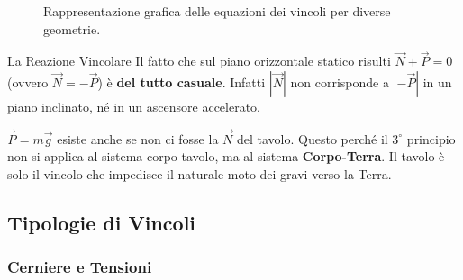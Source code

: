 \begin{figure}[h!]
    \caption{Rappresentazione grafica delle equazioni dei vincoli per diverse geometrie.}
    \label{fig:vincoli_rappresentazione}
\end{figure}

\begin{osservazione}{La Reazione Vincolare}
Il fatto che sul piano orizzontale statico risulti $\vec{N} + \vec{P} = 0$ (ovvero $\vec{N} = -\vec{P}$) è \textbf{del tutto casuale}. Infatti $|\vec{N}|$ non corrisponde a $|-\vec{P}|$ in un piano inclinato, né in un ascensore accelerato.

$\vec{P} = m\vec{g}$ esiste anche se non ci fosse la $\vec{N}$ del tavolo. Questo perché il $3^{\circ}$ principio non si applica al sistema corpo-tavolo, ma al sistema \textbf{Corpo-Terra}. Il tavolo è solo il vincolo che impedisce il naturale moto dei gravi verso la Terra.
\end{osservazione}

\subsection{Tipologie di Vincoli}

\subsubsection{Cerniere e Tensioni}

